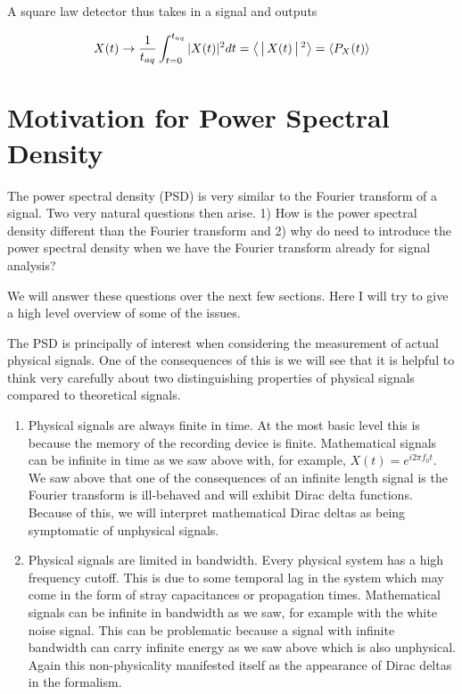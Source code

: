 \documentclass[12pt]{article}
\begin{document}
A square law detector thus takes in a signal and outputs

\begin{align}
X(t) \rightarrow \frac{1}{t_{aq}}\int_{t=0}^{t_{aq}} |X(t)|^2 dt = \Braket{|X(t)|^2} = \Braket{P_X(t)}
\end{align}

\section{Motivation for Power Spectral Density}

The power spectral density (PSD) is very similar to the Fourier transform of a signal.
Two very natural questions then arise.
1) How is the power spectral density different than the Fourier transform and 2) why do need to introduce the power spectral density when we have the Fourier transform already for signal analysis?

We will answer these questions over the next few sections.
Here I will try to give a high level overview of some of the issues.

The PSD is principally of interest when considering the measurement of actual physical signals.
One of the consequences of this is we will see that it is helpful to think very carefully about two distinguishing properties of physical signals compared to theoretical signals.

\begin{enumerate}
\item{Physical signals are always finite in time. At the most basic level this is because the memory of the recording device is finite. Mathematical signals can be infinite in time as we saw above with, for example, $X(t) = e^{i2\pi f_0 t}$. We saw above that one of the consequences of an infinite length signal is the Fourier transform is ill-behaved and will exhibit Dirac delta functions. Because of this, we will interpret mathematical Dirac deltas as being symptomatic of unphysical signals.}
\item{Physical signals are limited in bandwidth. Every physical system has a high frequency cutoff. This is due to some temporal lag in the system which may come in the form of stray capacitances or propagation times. Mathematical signals can be infinite in bandwidth as we saw, for example with the white noise signal. This can be problematic because a signal with infinite bandwidth can carry infinite energy as we saw above which is also unphysical. Again this non-physicality manifested itself as the appearance of Dirac deltas in the formalism.}
\end{enumerate}
\end{document}
